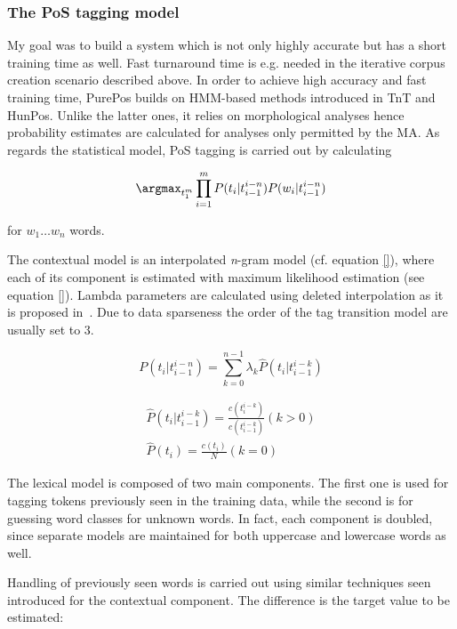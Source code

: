 \subsubsection{The PoS tagging model}

My goal was to build a system which is not only highly accurate but has a short training time as well.
Fast turnaround time is e.g. needed in the iterative corpus creation scenario described above.
In order to achieve high accuracy and fast training time, PurePos builds on HMM-based methods introduced in TnT and HunPos.
Unlike the latter ones, it relies on morphological analyses hence probability estimates are calculated for analyses only permitted by the MA.
As regards the statistical model, PoS tagging is carried out by calculating

\begin{equation}
\argmax_{t_1^m} \prod_{i=1}^m P(t_i | t_{i-1}^{i-n}) P(w_i|t_{i-1}^{i-n})
\end{equation}

for $w_1 \dots w_n$ words. 

The contextual model is an interpolated \emph{\emph{n}}-gram model (cf. equation \eqref{}), where each of its component is estimated with maximum likelihood estimation (see equation \eqref{}).
Lambda parameters are calculated using deleted interpolation as it is proposed in~\cite{}.
Due to data sparseness the order of the tag transition model are usually set to 3.

\begin{equation} 
P(t_i | t_{i-1}^{i-n}) = \sum_{k=0}^{n-1} \lambda_k \hat{P}(t_i|t_{i-1}^{i-k})
\end{equation}

\begin{align} 
\hat{P}(t_i|t_{i-1}^{i-k}) = \frac{c(t^{i-k}_i)}{c(t_{i-1}^{i-k})} (k>0) \\
\hat{P}(t_i) = \frac{c(t_i)}{N} (k=0)
\end{align}

The lexical model is composed of two main components. The first one is used for tagging tokens previously seen in the training data, while the second is for guessing word classes for unknown words. In fact, each component is doubled, since separate models are maintained for both uppercase and lowercase words as well. 

Handling of previously seen words is carried out using similar techniques seen introduced for the contextual component. The difference is the target value to be estimated:

